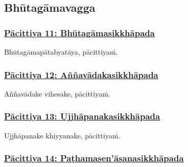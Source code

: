 \subsection{Bhūtagāmavagga}
\label{pc-vagga2}

\subsubsection*{\hyperref[exp11]{Pācittiya 11: Bhūtagāmasikkhāpada}}
\label{pac11}

Bhūtagāmapātabyatāya,\makeatletter\hyperlink{endnote237-appendix}\makeatother{} pācittiyaṁ.



\subsubsection*{\hyperref[exp12]{Pācittiya 12: Aññavādakasikkhāpada}}
\label{pac12}

Aññavādake vihesake, pācittiyaṁ.



\subsubsection*{\hyperref[exp13]{Pācittiya 13: Ujjhāpanakasikkhāpada}}
\label{pac13}

Ujjhāpanake khiyyanake,\makeatletter\hyperlink{endnote238-appendix}\makeatother{} pācittiyaṁ.



\subsubsection*{\hyperref[exp14]{Pācittiya 14: Paṭhamasen'āsanasikkhāpada}}
\label{pac14}

